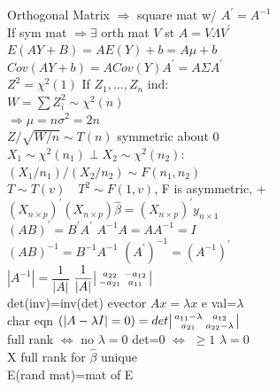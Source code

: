 \documentclass[10pt,landscape]{article}
\newenvironment{lmat}
{\left|\begin{smallmatrix}}
	{\end{smallmatrix}\right|}
\newcommand{\lm}{\lambda}
\newcommand{\sg}{\sigma}
\newcommand{\hb}{\hat{\beta}}
\newcommand{\lra}{\Leftrightarrow}
\newcommand{\ra}{\Rightarrow}
\begin{document}
\raggedright
\footnotesize
\begin{multicols*}{4}
\setlength{\premulticols}{1pt}
\setlength{\postmulticols}{1pt}
\setlength{\multicolsep}{1pt}
\setlength{\columnsep}{2pt}

\setlength{\columnseprule}{.25pt}
\setlength{\premulticols}{.25pt}
\setlength{\postmulticols}{.25pt}
\setlength{\multicolsep}{.25pt}
\setlength{\columnsep}{.25pt}


Orthogonal Matrix $\ra$ square mat w/ $A^{\prime}=A^{-1}$\\
If sym mat $\ra  \exists$ orth mat $V$ st $A=V\Lambda V^{\prime}$\\
$E(AY+B)=AE(Y)+b=A\mu+b$\\
$Cov(AY+b)=ACov(Y)A^{\prime}=A\Sigma A^{\prime}$\\
$Z^2=\chi^2(1)$ If $Z_1,\dots,Z_n$ ind:\\
$W=\sum Z_i^2\sim \chi^2(n)$\\
$\ra \mu=n \sg^2=2n$\\
$Z/\sqrt{W/n}\sim T(n)$ symmetric about 0\\
$X_1\sim \chi^2(n_1)\perp X_2\sim \chi^2(n_2)$:\\
$(X_1/n_1)/(X_2/n_2)\sim F(n_1,n_2)$\\
$T\sim T(v) \quad T^2\sim F(1,v)$, F is asymmetric, +\\
$(X_{n\times p})^{'}(X_{n \times p})\hb=(X_{n\times p})^{'}y_{n\times 1}$ \\
$(AB)^{'}=B^{'}A^{'}$\quad
$A^{-1}A=AA^{-1}=I$\\
$(AB)^{-1}=B^{-1}A^{-1}$\quad
$(A^{'})^{-1}=(A^{-1})^{'}$\\
$|A^{-1}|=\dfrac{1}{|A|}$\quad
$\dfrac{1}{|A|}
\begin{lmat}
a_{22}&-a_{12}\\
-a_{21}& a_{11}
\end{lmat}$\\
det(inv)=inv(det)\quad
evector $Ax=\lm x$\quad
e val=$\lm$\\
char eqn $(|A-\lm I|=0)
=det\begin{lmat}
a_{11}-\lm & a_{12}\\
a_{21} & a_{22}-\lm
\end{lmat}$\\
full rank $\lra$ no $\lm=0$\quad
det=0  $\lra$ $\geq 1$ $\lm=0$\\
X full rank for $\hb$ unique\\
E(rand mat)=mat of E\\

\end{multicols*}
\end{document}
